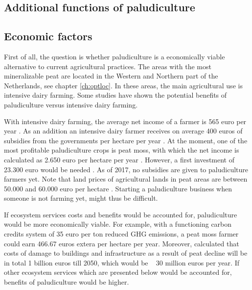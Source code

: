 {\begin{enumerate}
\section{Additional functions of paludiculture}

\subsection{Economic factors}
First of all, the question is whether paludiculture is a economically viable alternative to current agricultural practices. The areas with the most mineralizable peat are located in the Western and Northern part of the Netherlands, see chapter \ref{ch:optloc}. In these areas, the main agricultural use is intensive dairy farming. Some studies have shown the potential benefits of paludiculture versus intensive dairy farming. 

With intensive dairy farming, the average net income of a farmer is 565 euro per year \citep{van2013rewetting}. As an addition an intensive dairy farmer receives on average 400 euros of subsidies from the governments per hectare per year \citep{van2013rewetting}. At the moment, one of the most profitable paludiculture crops is peat moss, with which the net income is calculated as 2.650 euro per hectare per year \citep{van2013rewetting}. However, a first investment of 23.300 euro would be needed \citep{van2013rewetting}. As of 2017, no subsidies are given to paludiculture farmers yet. Note that land prices of agricultural lands in peat areas are between 50.000 and 60.000 euro per hectare \citep{}. Starting a paludiculture business when someone is not farming yet, might thus be difficult.

If ecosystem services costs and benefits would be accounted for, paludiculture would be more economically viable. For example, with a functioning carbon credits system of 35 euro per ton reduced GHG emissions, a peat moss farmer could earn 466.67 euros extera per hectare per year. Moreover, \citet{van2016dalende} calculated that costs of damage to buildings and infrastructure as a result of peat decline will be in total 1 billion euros till 2050, which would be ~ 30 million euros per year. If other ecosystem services which are presented below would be accounted for, benefits of paludiculture would be higher.


\end{enumerate}}
